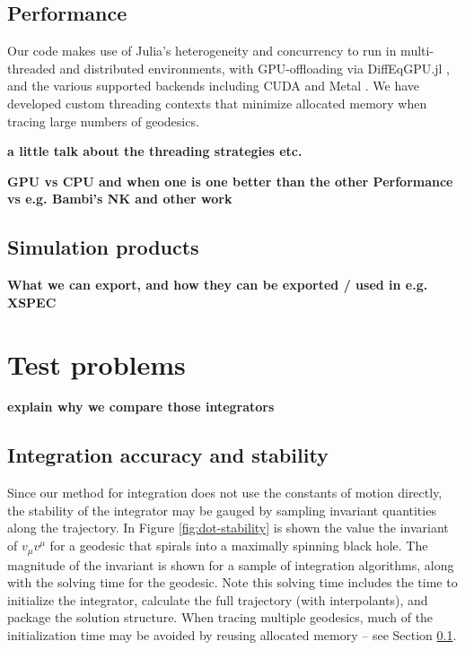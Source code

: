 \documentclass[fleqn,usenatbib]{mnras}
\newcommand{\todo}[1]{{\bf \color{red} #1}}
\begin{document}
\subsection{Performance}
\label{sec:performance}

Our code makes use of Julia's heterogeneity and concurrency to run in multi-threaded and distributed environments, with GPU-offloading via DiffEqGPU.jl \citep{utkarsh2023automated}, and the various supported backends including CUDA and Metal \citep{besard2018juliagpu}. We have developed custom threading contexts that minimize allocated memory when tracing large numbers of geodesics.


\todo{a little talk about the threading strategies etc.}

\todo{GPU vs CPU and when one is one better than the other
Performance vs e.g. Bambi's NK and other work}

\subsection{Simulation products}

\todo{What we can export, and how they can be exported / used in e.g. XSPEC}

\section{Test problems}

\todo{explain why we compare those integrators}

\subsection{Integration accuracy and stability}

Since our method for integration does not use the constants of motion directly, the stability of the integrator may be gauged by sampling invariant quantities along the trajectory. In Figure \ref{fig:dot-stability} is shown the value the invariant of $v_\mu v^\mu$ for a geodesic that spirals into a maximally spinning black hole. The magnitude of the invariant is shown for a sample of integration algorithms, along with the solving time for the geodesic. Note this solving time includes the time to initialize the integrator, calculate the full trajectory (with interpolants), and package the solution structure. When tracing multiple geodesics, much of the initialization time may be avoided by reusing allocated memory -- see Section \ref{sec:performance}.
\end{document}
